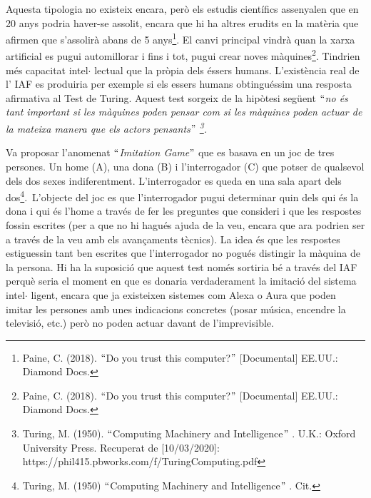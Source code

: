 \documentclass[12pt]{article}
\renewcommand{\_}{\kern-1.5pt\textunderscore\kern-1.5pt}
\begin{document}
\begin{itemize}
\vspace{\baselineskip}
\begin{justify}
Aquesta tipologia no existeix encara, però els estudis científics assenyalen que en 20 anys podria haver-se assolit, encara que hi ha altres erudits en la matèria que afirmen que s’assolirà abans de 5 anys\footnote{ Paine, C. (2018). $``$Do you trust this computer?$"$  [Documental] EE.UU.: Diamond Docs. }. El canvi principal vindrà quan la xarxa artificial es pugui automillorar i fins i tot, pugui crear noves màquines\footnote{ Paine, C. (2018). $``$Do you trust this computer?$"$  [Documental] EE.UU.: Diamond Docs. }. Tindrien més capacitat intel$ \cdot $ lectual que la pròpia dels éssers humans.  L’existència real de l’ IAF es produiria per exemple si els essers humans obtinguéssim una resposta afirmativa al Test de Turing. Aquest test sorgeix de la hipòtesi següent \textit{$``$no és tant important si les màquines poden pensar com si les màquines poden actuar de la mateixa manera que els actors pensants$"$ \footnote{ Turing, M. (1950). $``$Computing Machinery and Intelligence$"$ . U.K.: Oxford University Press. Recuperat de [10/03/2020]: https://phil415.pbworks.com/f/TuringComputing.pdf }. }
\end{justify}\par


\vspace{\baselineskip}
\begin{justify}
Va proposar l’anomenat $``$\textit{Imitation Game}$"$  que es basava en un joc de tres persones. Un home (A), una dona (B) i l’interrogador (C) que potser de qualsevol dels dos sexes indiferentment. L’interrogador es queda en una sala apart dels dos\footnote{ Turing, M. (1950) $``$Computing Machinery and Intelligence$"$ . Cit. }.\  L’objecte del joc es que l’interrogador pugui determinar quin dels qui és la dona i qui és l’home a través de fer les preguntes que consideri i que les respostes fossin escrites (per a que no hi hagués ajuda de la veu, encara que ara podrien ser a través de la veu amb els avançaments tècnics). La idea és que les respostes estiguessin tant ben escrites que l’interrogador no pogués distingir la màquina de la persona. Hi ha la suposició que aquest test només sortiria bé a través del IAF perquè seria el moment en que es donaria verdaderament la imitació del sistema intel$ \cdot $ ligent, encara que ja existeixen sistemes com Alexa o Aura que poden imitar les persones amb unes indicacions concretes (posar música, encendre la televisió, etc.) però no poden actuar davant de l’imprevisible.
\end{justify}\par



\end{itemize}
\end{document}
